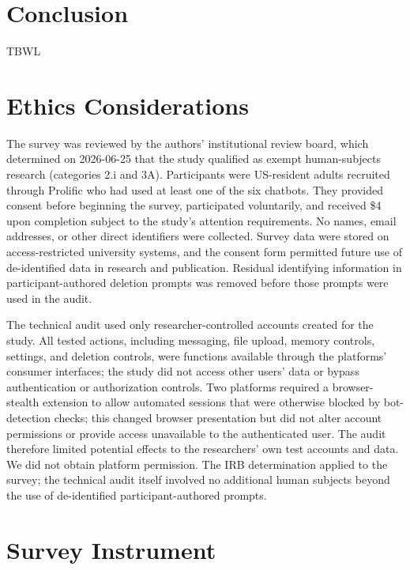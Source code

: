 \documentclass[conference,compsoc]{IEEEtran}
\begin{document}
\section{Conclusion}
TBWL

\section*{Ethics Considerations}

The survey was reviewed by the authors' institutional review board, which determined on 2026-06-25 that the study qualified as exempt human-subjects research (categories 2.i and 3A). Participants were US-resident adults recruited through Prolific who had used at least one of the six chatbots. They provided consent before beginning the survey, participated voluntarily, and received \$4 upon completion subject to the study's attention requirements. No names, email addresses, or other direct identifiers were collected. Survey data were stored on access-restricted university systems, and the consent form permitted future use of de-identified data in research and publication. Residual identifying information in participant-authored deletion prompts was removed before those prompts were used in the audit.

The technical audit used only researcher-controlled accounts created for the study. All tested actions, including messaging, file upload, memory controls, settings, and deletion controls, were functions available through the platforms' consumer interfaces; the study did not access other users' data or bypass authentication or authorization controls. Two platforms required a browser-stealth extension to allow automated sessions that were otherwise blocked by bot-detection checks; this changed browser presentation but did not alter account permissions or provide access unavailable to the authenticated user. The audit therefore limited potential effects to the researchers' own test accounts and data. We did not obtain platform permission. The IRB determination applied to the survey; the technical audit itself involved no additional human subjects beyond the use of de-identified participant-authored prompts.

\appendix

\section{Survey Instrument}
\label{sec:instrument}
\end{document}
